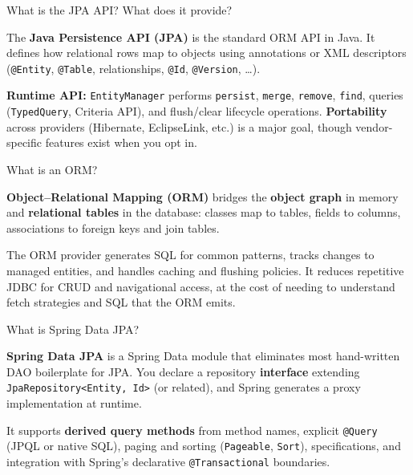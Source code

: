 \question[4]
What is the JPA API? What does it provide?
\begin{solutionorbox}[1.3in]
  The \textbf{Java Persistence API (JPA)} is the standard ORM API in Java. It defines how relational rows map to objects using annotations or XML descriptors (\texttt{@Entity}, \texttt{@Table}, relationships, \texttt{@Id}, \texttt{@Version}, \ldots).

  \noindent\textbf{Runtime API:} \texttt{EntityManager} performs \texttt{persist}, \texttt{merge}, \texttt{remove}, \texttt{find}, queries (\texttt{TypedQuery}, Criteria API), and flush/clear lifecycle operations. \textbf{Portability} across providers (Hibernate, EclipseLink, etc.) is a major goal, though vendor-specific features exist when you opt in.
\end{solutionorbox}

\question[4]
What is an ORM?
\begin{solutionorbox}[1.05in]
  \textbf{Object--Relational Mapping (ORM)} bridges the \textbf{object graph} in memory and \textbf{relational tables} in the database: classes map to tables, fields to columns, associations to foreign keys and join tables.

  The ORM provider generates SQL for common patterns, tracks changes to managed entities, and handles caching and flushing policies. It reduces repetitive JDBC for CRUD and navigational access, at the cost of needing to understand fetch strategies and SQL that the ORM emits.
\end{solutionorbox}

\question[4]
What is Spring Data JPA?
\begin{solutionorbox}[1.2in]
  \textbf{Spring Data JPA} is a Spring Data module that eliminates most hand-written DAO boilerplate for JPA. You declare a repository \textbf{interface} extending \texttt{JpaRepository<Entity, Id>} (or related), and Spring generates a proxy implementation at runtime.

  It supports \textbf{derived query methods} from method names, explicit \texttt{@Query} (JPQL or native SQL), paging and sorting (\texttt{Pageable}, \texttt{Sort}), specifications, and integration with Spring's declarative \texttt{@Transactional} boundaries.
\end{solutionorbox}

